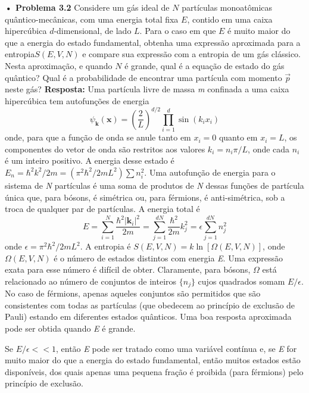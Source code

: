 \documentclass[12pt]{article}
\begin{document}
\textbf{• Problema 3.2} Considere um gás ideal de $N$ partículas monoatômicas quântico-mecânicas, com uma energia total fixa $E$, contido em uma caixa hipercúbica $d$-dimensional, de lado $L$. Para o caso em que $E$ é muito maior do que a energia do estado fundamental, obtenha uma expressão aproximada para a entropia$ S(E, V, N)$ e compare sua expressão com a entropia de um gás clássico. Nesta aproximação, e quando $N$ é grande, qual é a equação de estado do gás quântico? Qual é a probabilidade de encontrar uma partícula com momento $\vec{p}$ neste gás?
\textbf{Resposta:} Uma partícula livre de massa \textit{m} confinada a uma caixa hipercúbica tem autofunções de energia 
\[
\psi_{\mathbf{k}}(\mathbf{x}) = \left( \frac{2}{L} \right)^{d/2} \prod_{i=1}^{d} \sin(k_i x_i)
\]
onde, para que a função de onda se anule tanto em $x_i = 0$ quanto em $x_i = L$, os componentes do vetor de onda são restritos aos valores $k_i = n_i\pi/L$, onde cada $n_i$ é um inteiro positivo. A energia desse estado é $E_n = \hbar^2k^2/2m = (\pi^2\hbar^2/2mL^2) \sum n_i^2$. Uma autofunção de energia para o sistema de \textit{N} partículas é uma soma de produtos de \textit{N} dessas funções de partícula única que, para bósons, é simétrica ou, para férmions, é anti-simétrica, sob a troca de qualquer par de partículas. A energia total é 
\[
E = \sum_{i=1}^N \frac{\hbar^2 |\mathbf{k}_i|^2}{2m} = \sum_{j=1}^{dN} \frac{\hbar^2}{2m} k_j^2 = \epsilon \sum_{j=1}^{dN} n_j^2
\]
onde $\epsilon = \pi^2\hbar^2/2mL^2$. A entropia é $S(E, V, N) = k \ln[\Omega(E, V, N)]$, onde $\Omega(E, V, N)$ é o número de estados distintos com energia \textit{E}. Uma expressão exata para esse número é difícil de obter. Claramente, para bósons, $\Omega$ está relacionado ao número de conjuntos de inteiros $\{n_j\}$ cujos quadrados somam $E/\epsilon$. No caso de férmions, apenas aqueles conjuntos são permitidos que são consistentes com todas as partículas (que obedecem ao princípio de exclusão de Pauli) estando em diferentes estados quânticos. Uma boa resposta aproximada pode ser obtida quando \textit{E} é grande.

Se $E/\epsilon << 1$, então \textit{E} pode ser tratado como uma variável contínua e, se \textit{E} for muito maior do que a energia do estado fundamental, então muitos estados estão disponíveis, dos quais apenas uma pequena fração é proibida (para férmions) pelo princípio de exclusão.
\end{document}
